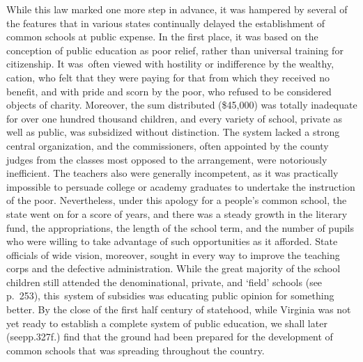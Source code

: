 \documentclass[
]{book}
\begin{document}
While this law marked one more step in advance, it was hampered by several of the features that in various states continually delayed the establishment of common schools at public expense. In the first place, it was based on the conception of public education as poor relief, rather than universal training for citizenship. It was~often viewed with hostility or indifference by the wealthy, cation, who felt that they were paying for that from which they received no benefit, and with pride and scorn by the poor, who refused to be considered objects of charity. Moreover, the sum distributed (\$45,000) was totally inadequate for over one hundred thousand children, and every variety of school, private as well as public, was subsidized without distinction. The system lacked a strong central organization, and the commissioners, often appointed by the county judges from the classes most opposed to the arrangement, were notoriously inefficient. The teachers also were generally incompetent, as it was practically impossible to persuade college or academy graduates to undertake the instruction of the poor. Nevertheless, under this apology for a people's common school, the state went on for a score of years, and there was a steady growth in the literary fund, the appropriations, the length of the school term, and the number of pupils who were willing to take advantage of such opportunities as it afforded. State officials of wide vision, moreover, sought in every way to improve the teaching corps and the defective administration. While the great majority of the school children still attended the denominational, private, and `field' schools (see p.~253), this~system of subsidies was educating public opinion for something better. By the close of the first half century of statehood, while Virginia was not yet ready to establish a complete system of public education, we shall later (seepp.327f.) find that the ground had been prepared for the development of common schools that was spreading throughout the country.
\end{document}
